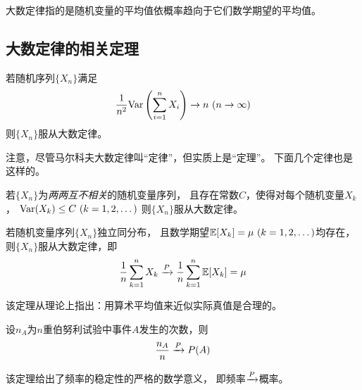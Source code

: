 \begin{remark}
  大数定律指的是随机变量的平均值依概率趋向于它们数学期望的平均值。
\end{remark}

\subsection{大数定律的相关定理}
\begin{theorem}[马尔可夫大数定律]
  若随机序列$\{X_n\}$满足
  \begin{displaymath}
    \frac{1}{n^2}\textrm{Var}\left(\sum_{i=1}^{n}X_i\right)\to n\ (n\to\infty)
  \end{displaymath}
  则$\{X_n\}$服从大数定律。
\end{theorem}

\begin{remark}
  注意，尽管马尔科夫大数定律叫``定律''，但实质上是``定理''。
  下面几个定律也是这样的。
\end{remark}

\begin{theorem}[切比雪夫大数定律]
  若$\{X_n\}$为\emph{两两互不相关}的随机变量序列，
  且存在常数$C$，使得对每个随机变量$X_k$，
  $\textrm{Var}(X_k)\le C\ (k=1,2,\dots)$
  则$\{X_n\}$服从大数定律。
\end{theorem}

\begin{theorem}[辛钦大数定律]
  若随机变量序列$\{X_n\}$独立同分布，
  且数学期望$\mexpect[X_k]=\mu\ (k=1,2,\dots)$均存在，
  则$\{X_n\}$服从大数定律，即
  \begin{displaymath}
    \frac{1}{n}\sum_{k=1}^n X_k \xrightarrow{P}
      \frac{1}{n}\sum_{k=1}^{n}\mathbb{E}[X_k] = \mu
  \end{displaymath}
\end{theorem}

\begin{remark}
  该定理从理论上指出：用算术平均值来近似实际真值是合理的。
\end{remark}

\begin{theorem}[伯努利大数定律]
  设$n_A$为$n$重伯努利试验中事件$A$发生的次数，则
  \begin{displaymath}
    \frac{n_A}{n}\xrightarrow{P} P(A)
  \end{displaymath}
\end{theorem}

\begin{remark}
  该定理给出了频率的稳定性的严格的数学意义，
  即频率$\xrightarrow{P}$概率。
\end{remark}

